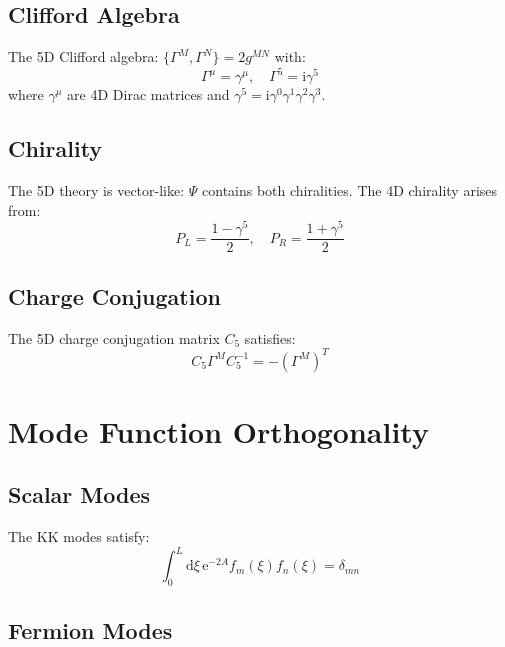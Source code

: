 \documentclass[11pt,a4paper]{article}
\newcommand{\dd}{\mathrm{d}}
\newcommand{\ii}{\mathrm{i}}
\newcommand{\ee}{\mathrm{e}}
\begin{document}
\subsection{Clifford Algebra}

The 5D Clifford algebra: $\{\Gamma^M, \Gamma^N\} = 2g^{MN}$ with:
\begin{equation}
\Gamma^\mu = \gamma^\mu, \quad \Gamma^5 = \ii\gamma^5
\label{eq:clifford}
\end{equation}
where $\gamma^\mu$ are 4D Dirac matrices and $\gamma^5 = \ii\gamma^0\gamma^1\gamma^2\gamma^3$.

\subsection{Chirality}

The 5D theory is vector-like: $\Psi$ contains both chiralities.
The 4D chirality arises from:
\begin{equation}
P_L = \frac{1 - \gamma^5}{2}, \quad P_R = \frac{1 + \gamma^5}{2}
\label{eq:projectors}
\end{equation}

\subsection{Charge Conjugation}

The 5D charge conjugation matrix $C_5$ satisfies:
\begin{equation}
C_5 \Gamma^M C_5^{-1} = -(\Gamma^M)^T
\label{eq:charge-conj}
\end{equation}

\section{Mode Function Orthogonality}
\label{app:orthogonality}

\subsection{Scalar Modes}

The KK modes satisfy:
\begin{equation}
\int_0^L \dd\xi\, \ee^{-2A} f_m(\xi) f_n(\xi) = \delta_{mn}
\label{eq:orthogonality}
\end{equation}

\subsection{Fermion Modes}
\end{document}
